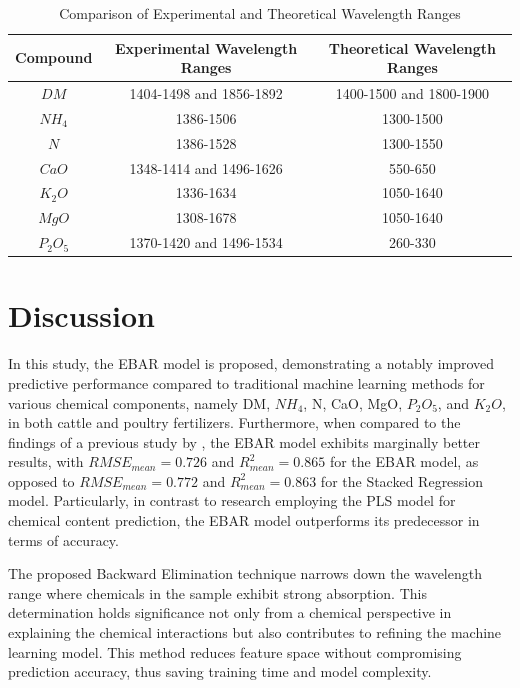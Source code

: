 \documentclass[10pt, a4paper, oneside]{article}
\begin{document}
\setlength{\tabcolsep}{3pt}
\begin{table}[!ht]
    \centering
    \begin{tabular}{|c|c|c|}
        \hline
        \textbf{Compound} & \textbf{Experimental Wavelength Ranges} & \textbf{Theoretical Wavelength Ranges} \\
        \hline
        \(DM\) & 1404-1498 and 1856-1892 & 1400-1500 and 1800-1900 \\ \hline
        \(NH_4\) & 1386-1506 & 1300-1500 \\ \hline
        \(N\) & 1386-1528 & 1300-1550 \\ \hline
        \(CaO\) & 1348-1414 and 1496-1626 & 550-650 \\ \hline
        \(K_2O\) & 1336-1634 & 1050-1640 \\ \hline
        \(MgO\) & 1308-1678 & 1050-1640 \\ \hline
        \(P_2O_5\) & 1370-1420 and 1496-1534 & 260-330 \\
        \hline
    \end{tabular}
    \caption{Comparison of Experimental and Theoretical Wavelength Ranges}
    \label{tab:table5}
\end{table}

\section{Discussion}
In this study, the EBAR model is proposed, demonstrating a notably improved predictive performance compared to traditional machine learning methods for various chemical components, namely DM, \(NH_4\), N, CaO, MgO, \(P_2O_5\), and \(K_2 O\), in both cattle and poultry fertilizers. Furthermore, when compared to the findings of a previous study by \cite{cobbinah2022using}, the EBAR model exhibits marginally better results, with \(RMSE_{mean}=0.726\) and \(R_{mean}^2=0.865\) for the EBAR model, as opposed to \(RMSE_{mean}=0.772\) and \(R_{mean}^2=0.863\) for the Stacked Regression model. Particularly, in contrast to research employing the PLS model for chemical content prediction, the EBAR model outperforms its predecessor in terms of accuracy.

The proposed Backward Elimination technique narrows down the wavelength range where chemicals in the sample exhibit strong absorption. This determination holds significance not only from a chemical perspective in explaining the chemical interactions but also contributes to refining the machine learning model. This method reduces feature space without compromising prediction accuracy, thus saving training time and model complexity.
\end{document}
